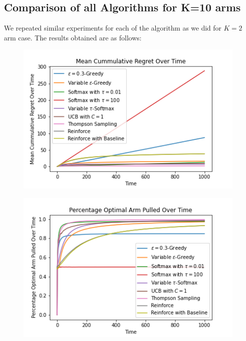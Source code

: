 \documentclass{article}
\begin{document}
		\subsection{Comparison of all Algorithms for K=10 arms}
		\label{10_bernoulli_comparison}
		We repeated similar experiments for each of the algorithm as we did for $K=2$ arm case. The results obtained are as follows:
		
		\begin{figure}[H]
			\graphicspath{ {../Experiments/Bernoulli_10_every_case/} }
			\centering
			\begin{minipage}{.5\textwidth}
			  \centering
			  \includegraphics[width=\linewidth]{Mean_Cummulative_Regret_Over_Time.png}
			  \label{fig:test1}
			\end{minipage}%
			\begin{minipage}{.5\textwidth}
			  \centering
			  \includegraphics[width=\linewidth]{Percentage_Optimal_Arm_Pulled_Over_Time.png}
			  \label{fig:test2}
			\end{minipage}
			\end{figure}
			
\end{document}
